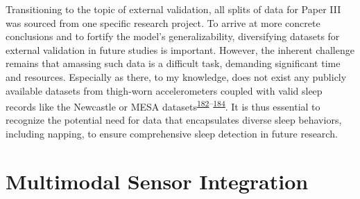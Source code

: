 \documentclass[
  10pt,
]{scrbook}
\begin{document}
Transitioning to the topic of external validation, all splits of data
for Paper III was sourced from one specific research project. To arrive
at more concrete conclusions and to fortify the model's
generalizability, diversifying datasets for external validation in
future studies is important. However, the inherent challenge remains
that amassing such data is a difficult task, demanding significant time
and resources. Especially as there, to my knowledge, does not exist any
publicly available datasets from thigh-worn accelerometers coupled with
valid sleep records like the Newcastle or MESA
datasets\textsuperscript{\protect\hyperlink{ref-hees_newcastle_2018}{182}--\protect\hyperlink{ref-chen_2015}{184}}.
It is thus essential to recognize the potential need for data that
encapsulates diverse sleep behaviors, including napping, to ensure
comprehensive sleep detection in future research.

\hypertarget{multimodal-sensor-integration}{%
\section{Multimodal Sensor
Integration}\label{multimodal-sensor-integration}}
\end{document}

